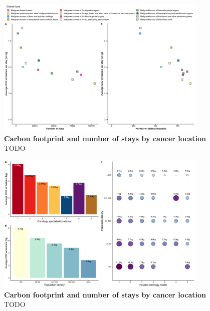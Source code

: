 \begin{figure}[h!]
    \includegraphics[width=0.9\textwidth]{images/routes/sup_fig_4.png}
    \centering
    \caption{
        \textbf{Carbon footprint and number of stays by cancer location}
        TODO }
    \label{fig:avg-carbon-footprint-pathology}
\end{figure}

\begin{figure}[h!]
    \includegraphics[width=0.9\textwidth]{images/routes/sup_fig_5.png}
    \centering
    \caption{
        \textbf{Carbon footprint and number of stays by cancer location}
        TODO }
    \label{fig:avg-carbon-footprint-density-cluster}
\end{figure}

